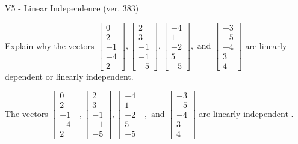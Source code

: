 \begin{exercise}
  \begin{exerciseTitle}V5 - Linear Independence (ver. 383)\end{exerciseTitle}
  \begin{exerciseStatement}
    Explain why the vectors \(\left[\begin{array}{r}
0 \\
2 \\
-1 \\
-4 \\
2
\end{array}\right] , \left[\begin{array}{r}
2 \\
3 \\
-1 \\
-1 \\
-5
\end{array}\right] , \left[\begin{array}{r}
-4 \\
1 \\
-2 \\
5 \\
-5
\end{array}\right] , \text{ and } \left[\begin{array}{r}
-3 \\
-5 \\
-4 \\
3 \\
4
\end{array}\right]\) are linearly dependent or linearly independent.	


  \end{exerciseStatement}
  \begin{exerciseAnswer}
   The vectors \(\left[\begin{array}{r}
0 \\
2 \\
-1 \\
-4 \\
2
\end{array}\right] , \left[\begin{array}{r}
2 \\
3 \\
-1 \\
-1 \\
-5
\end{array}\right] , \left[\begin{array}{r}
-4 \\
1 \\
-2 \\
5 \\
-5
\end{array}\right] , \text{ and } \left[\begin{array}{r}
-3 \\
-5 \\
-4 \\
3 \\
4
\end{array}\right]\) are 
  	 linearly independent  .
  


  \end{exerciseAnswer}
\end{exercise}
